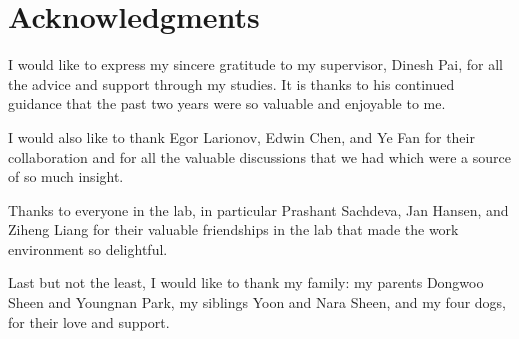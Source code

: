 
\chapter{Acknowledgments}

I would like to express my sincere gratitude to my supervisor, Dinesh Pai, for all the advice and support through my studies.
It is thanks to his continued guidance that the past two years were so valuable and enjoyable to me.

I would also like to thank Egor Larionov, Edwin Chen, and Ye Fan for their collaboration and for all the valuable discussions that we had which were a source of so much insight.

Thanks to everyone in the lab, in particular Prashant Sachdeva, Jan Hansen, and Ziheng Liang for their valuable friendships in the lab that made the work environment so delightful.

Last but not the least, I would like to thank my family: my parents Dongwoo Sheen and Youngnan Park, my siblings Yoon and Nara Sheen, and my four dogs, for their love and support.